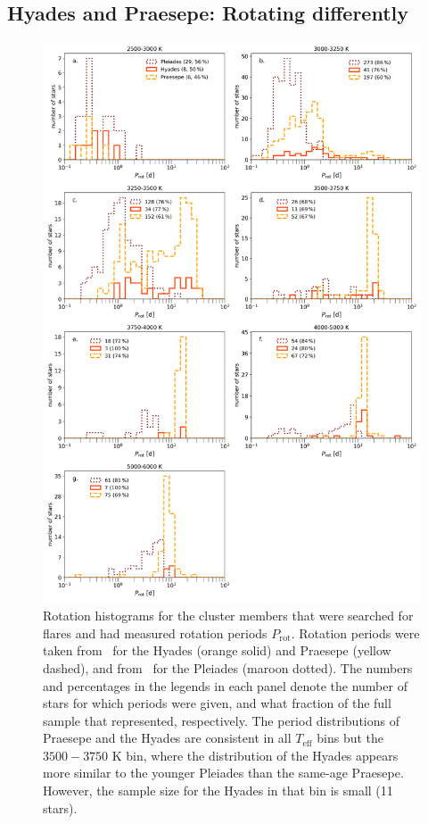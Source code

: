 \documentclass{aa}
\begin{document}
\subsection{Hyades and Praesepe: Rotating differently}
\label{sec:hyaprarot}
   \begin{figure}
   \centering
            \includegraphics[width=.85\hsize]{pics/rotation/SpT_wise_rotation.png}
         \caption{Rotation histograms for the cluster members that were searched for flares and had measured rotation periods $P_\mathrm{rot}$. Rotation periods were taken from~\citet{douglas2019} for the Hyades (orange solid) and Praesepe (yellow dashed), and from~\citet{rebull_pleiadesrot_2016} for the Pleiades (maroon dotted). The numbers and percentages in the legends in each panel denote the number of stars for which periods were given, and what fraction of the full sample that represented, respectively. The period distributions of Praesepe and the Hyades are consistent in all $T_\mathrm{eff}$ bins but the $3500-3750$ K bin, where the distribution of the Hyades appears more similar to the younger Pleiades than the same-age Praesepe. However, the sample size for the Hyades in that bin is small (11 stars).}
          \label{fig:rotation_histogram}
   \end{figure}
\end{document}
